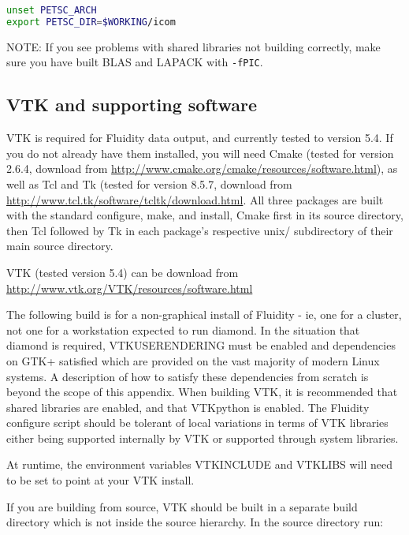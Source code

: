 \begin{lstlisting}[language=bash]
unset PETSC_ARCH
export PETSC_DIR=$WORKING/icom
\end{lstlisting}

NOTE: If you see problems with shared libraries not building correctly, make
sure you have built BLAS and LAPACK with \lstinline[language=bash]+-fPIC+.

\subsection{VTK and supporting software}
\label{sec:required_libraries_vtk}

VTK is required for Fluidity data output, and currently tested to version 5.4.
If you do not already have them installed, you will need Cmake (tested for
version 2.6.4, download from
\url{http://www.cmake.org/cmake/resources/software.html}), as well as Tcl and
Tk (tested for version 8.5.7, download from
\url{http://www.tcl.tk/software/tcltk/download.html}. All three packages are
built with the standard configure, make, and install, Cmake first in its source
directory, then Tcl followed by Tk in each package's respective unix/
subdirectory of their main source directory.

VTK (tested version 5.4) can be download from
\url{http://www.vtk.org/VTK/resources/software.html}

The following build is for a non-graphical install of Fluidity - ie, one for a
cluster, not one for a workstation expected to run diamond. In the situation
that diamond is required, VTK{\textunderscore}USE{\textunderscore}RENDERING
must be enabled and dependencies on GTK+ satisfied which are provided on the
vast majority of modern Linux systems. A description of how to satisfy these
dependencies from scratch is beyond the scope of this appendix. When building
VTK, it is recommended that shared libraries are enabled, and that VTKpython is
enabled. The Fluidity configure script should be tolerant of local variations
in terms of VTK libraries either being supported internally by VTK or supported
through system libraries.

At runtime, the environment variables VTK{\textunderscore}INCLUDE and
VTK{\textunderscore}LIBS will need to be set to point at your VTK install.

If you are building from source, VTK should be built in a separate build
directory which is not inside the source hierarchy. In the source directory
run:

